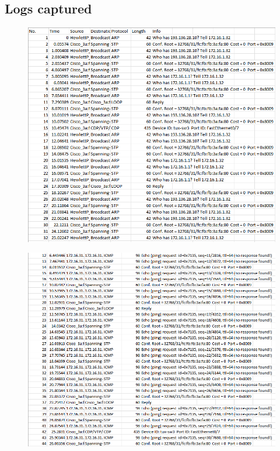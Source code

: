 \documentclass[a4paper,11pt,english]{article}
\begin{document}
        
        
        

    \subsection{Logs captured}
        \begin{figure}[H]
            \centering
            \includegraphics[scale=0.6]{./imgs/exp2-tux32-step7.png}
        \end{figure}

        \begin{figure}[H]
            \centering
            \includegraphics[scale=0.6]{./imgs/exp2-tux32-step72.png}
        \end{figure}
        
\end{document}
